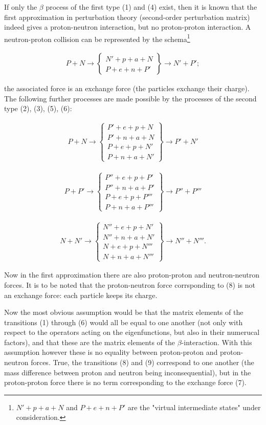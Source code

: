 \documentclass{article}
\newcommand{\nequ}[2]{
\begin{align*}
#1
\tag{#2}
\end{align*}
}
\begin{document}
If only the $\beta$ process of the first type (1) and (4) exist, then it is known that the first approximation in perturbation theory (second-order perturbation matrix) indeed gives a proton-neutron interaction, but no proton-proton interaction. A neutron-proton collision can be represented by the schema\footnote{$N'+p+a+N$ and $P+e+n+P'$ are the "virtual intermediate states" under consideration.}
\nequ{
P+N \to \left.\begin{cases}
 N' + p + a + N \\
 P + e + n + P'
 \end{cases}\right\} \to N' + P';
}{7}
the associated force is an exchange force (the particles exchange their charge). The following further processes are made possible by the processes of the second type (2), (3), (5), (6):
\nequ{
P+N\to \left.\begin{cases}
P' + e + p + N\\
P' + n + a + N\\
P + e + p + N'\\
P + n + a + N'
\end{cases}\right\} \to P' + N'
}{8}
\nequ{
P + P'\to \left.\begin{cases}
P'' + e + p + P'\\
P'' + n + a + P'\\
P + e + p + P'''\\
P + n + a + P'''
\end{cases}\right\} \to P'' + P'''
}{9}
\nequ{
N+N'\to \left.\begin{cases}
N'' + e + p + N'\\
N'' + n + a + N'\\
N + e + p + N'''\\
N + n + a + N'''
\end{cases}\right\} \to N'' + N'''.
}{10}
Now in the first approximation there are also proton-proton and neutron-neutron forces. It is to be noted that the proton-neutron force corrsponding to (8) is not an exchange force: each particle keeps its charge.

Now the most obvious assumption would be that the matrix elements of the transitions (1) through (6) would all be equal to one another (not only with respect to the operators acting on the eigenfunctions, but also in their numerucal factors), and that these are the  matrix elements of the $\beta$-interaction. With this assumption however these is no equality between proton-proton and proton-neutron forces. True, the transitions (8) and (9) correspond to one another (the mass difference between proton and neutron being inconsequential), but in the proton-proton force there is no term corresponding to the exchange force (7). 
\end{document}
